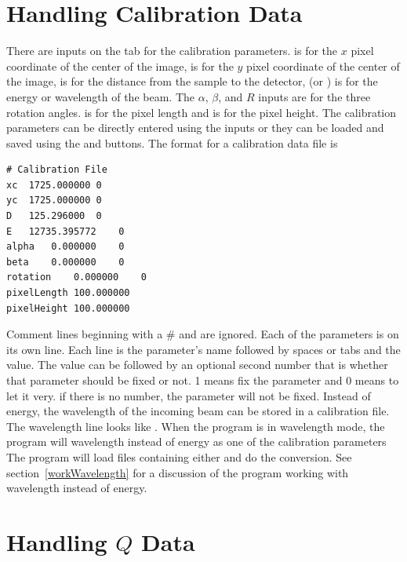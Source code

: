 \section{Handling Calibration Data}

There are inputs on the  tab 
for the calibration parameters.
 is for the $x$ pixel coordinate of the center of
the image,  is for the $y$ pixel coordinate of
the center of the image,  is for the distance from
the sample to the detector,
 (or \gui{$\lambda$:}) is for the energy
or wavelength of the beam. The $\alpha$, $\beta$, and
$R$ inputs are for the three rotation angles. 
 is for the pixel length
and  is for the pixel height.
The calibration parameters can be directly entered
using the inputs or they can be loaded and saved 
using the  and  
buttons. The format for a calibration data file is 
\begin{lstlisting}[caption={Calibration Parameters}]
# Calibration File
xc	1725.000000	0
yc	1725.000000	0
D	125.296000	0
E	12735.395772	0
alpha	0.000000	0
beta	0.000000	0
rotation	0.000000	0
pixelLength	100.000000
pixelHeight	100.000000
\end{lstlisting}
Comment lines beginning with
a \# and are ignored. Each of the parameters
is on its own line. Each line is the parameter's 
name followed by spaces or tabs and the
value. The value can be followed by an optional
second number that is whether that parameter
should be fixed or not. 1 means fix the parameter and 0 
means to let it very. if there is no number, the parameter will
not be fixed. Instead of energy, the wavelength of the incoming
beam can be stored in a calibration file.
The wavelength line looks like 
.
When the program is in wavelength mode, the program
will wavelength instead of energy as one of the calibration parameters 
The program will load files containing either and do the 
conversion. See section~\ref{workWavelength} for a discussion
of the program working with wavelength instead of energy.


\section{\texorpdfstring{Handling $Q$ Data}{Handling Q Data}}
\label{TheQValues}


